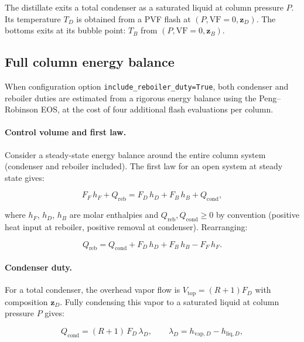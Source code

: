\documentclass[11pt,a4paper]{article}
\theoremstyle{definition}
\theoremstyle{plain}
\begin{document}
The distillate exits a total condenser as a saturated liquid at column pressure $P$. Its temperature $T_D$ is obtained from a PVF flash at $(P, \mathrm{VF}=0, \bm{z}_D)$. The bottoms exits at its bubble point: $T_B$ from $(P, \mathrm{VF}=0, \bm{z}_B)$.

\subsection{Full column energy balance}
\label{sec:energy_balance}

When configuration option \texttt{include\_reboiler\_duty=True}, both condenser and reboiler duties are estimated from a rigorous energy balance using the Peng--Robinson EOS, at the cost of four additional flash evaluations per column.

\paragraph{Control volume and first law.}
Consider a steady-state energy balance around the entire column system (condenser and reboiler included). The first law for an open system at steady state gives:

\begin{equation}
 F_F\, h_F + Q_{\mathrm{reb}}
 = F_D\, h_D + F_B\, h_B + Q_{\mathrm{cond}},
 \label{eq:EB_full}
\end{equation}

where $h_F$, $h_D$, $h_B$ are molar enthalpies and $Q_{\mathrm{reb}}, Q_{\mathrm{cond}} \geq 0$ by convention (positive heat input at reboiler, positive removal at condenser). Rearranging:

\begin{equation}
 Q_{\mathrm{reb}}
 = Q_{\mathrm{cond}}
 + F_D\, h_D + F_B\, h_B - F_F\, h_F.
 \label{eq:reb_from_cond}
\end{equation}

\paragraph{Condenser duty.}
For a total condenser, the overhead vapor flow is $V_{\mathrm{top}} = (R+1) F_D$ with composition $\bm{z}_D$. Fully condensing this vapor to a saturated liquid at column pressure $P$ gives:

\begin{equation}
 Q_{\mathrm{cond}}
 = (R+1)\, F_D\, \lambda_D,
 \qquad
 \lambda_D = h_{\mathrm{vap},D} - h_{\mathrm{liq},D},
\end{equation}
\end{document}
